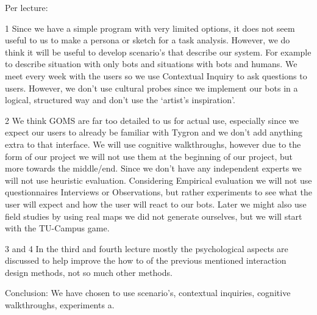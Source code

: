 Per lecture:

1
Since we have a simple program with very limited options, it does not seem useful to us to make a persona or sketch for a task analysis.
However, we do think it will be useful to develop scenario's that describe our system. For example to describe situation with only bots and situations with bots and humans.
We meet every week with the users so we use Contextual Inquiry to ask questions to users. However, we don’t use cultural probes since we implement our bots in a logical, structured way and don’t use the ‘artist’s inspiration’.

2
We think GOMS are far too detailed to us for actual use, especially since we expect our users to already be familiar with Tygron and we don’t add anything extra to that interface. 
We will use cognitive walkthroughs, however due to the form of our project we will not use them at the beginning of our project, but more towards the middle/end. 
Since we don’t have any independent experts we will not use heuristic evaluation. 
Considering Empirical evaluation we will not use questionnaires Interviews or Observations, but rather experiments to see what the user will expect and how the user will react to our bots. Later we might also use field studies by using real maps we did not generate ourselves, but we will start with the TU-Campus game.


3 and 4
In the third and fourth lecture mostly the psychological aspects are discussed to help improve the how to of the previous mentioned interaction design methods, not so much other methods.


Conclusion:
We have chosen to use scenario's, contextual inquiries, cognitive walkthroughs, experiments a.